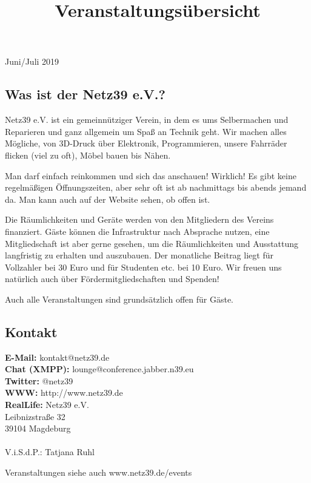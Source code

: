 \documentclass[flyer]{netz39} %
\begin{document}
	
\title{Veranstaltungsübersicht}{Juni/Juli 2019}

\begin{about}
	\section{Was ist der Netz39 e.V.?}
Netz39 e.V. ist ein gemeinnütziger Verein, in dem es ums Selbermachen und Reparieren und ganz allgemein um Spaß an Technik geht. Wir machen alles Mögliche, von 3D-Druck über Elektronik, Programmieren, unsere Fahrräder flicken (viel zu oft), Möbel bauen bis Nähen. 

Man darf einfach reinkommen und sich das anschauen! Wirklich! Es gibt keine regelmäßigen Öffnungszeiten, aber sehr oft ist ab nachmittags bis abends jemand da. Man kann auch auf der Website sehen, ob offen ist.

Die Räumlichkeiten und Geräte werden von den Mitgliedern des Vereins finanziert. Gäste können die Infrastruktur nach Absprache nutzen, eine Mitgliedschaft ist aber gerne gesehen, um die Räumlichkeiten und Ausstattung langfristig zu erhalten und auszubauen. Der monatliche Beitrag liegt für Vollzahler bei 30 Euro und für Studenten etc. bei 10 Euro. Wir freuen uns natürlich auch über Fördermitgliedschaften und Spenden!

Auch alle Veranstaltungen sind grundsätzlich offen für Gäste.
\end{about}

\begin{contact}
	\section{Kontakt}
	\textbf{E-Mail:} kontakt@netz39.de\\
	\textbf{Chat (XMPP):} lounge@conference.jabber.n39.eu\\
	\textbf{Twitter:} @netz39\\
	\textbf{WWW:} http://www.netz39.de\\
	\textbf{RealLife:} Netz39 e.V.\\
	Leibnizstraße 32\\
	39104 Magdeburg\\\\
	V.i.S.d.P.: Tatjana Ruhl
\end{contact}


\begin{entry}{Veranstaltungen}
siehe auch www.netz39.de/events
\end{entry}
\end{document}
